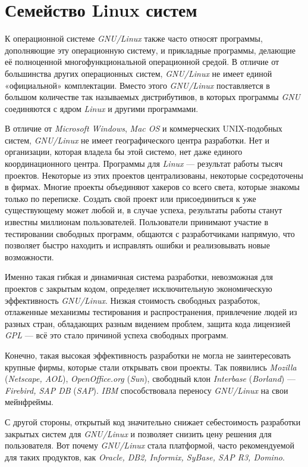 \section{Семейство Linux систем}

К операционной системе \textit{GNU/Linux} также часто относят программы, дополняющие эту операционную систему, и прикладные программы, делающие её полноценной многофункциональной операционной средой. В отличие от большинства других операционных систем, \textit{GNU/Linux} не имеет единой «официальной» комплектации. Вместо этого \textit{GNU/Linux} поставляется в большом количестве так называемых дистрибутивов, в которых программы \textit{GNU} соединяются с ядром \textit{Linux} и другими программами.

В отличие от \textit{Microsoft Windows}, \textit{Mac OS} и коммерческих UNIX-подобных систем, \textit{GNU/Linux} не имеет географического центра разработки. Нет и организации, которая владела бы этой системо, нет даже единого координационного центра. Программы для \textit{Linux} — результат работы тысяч проектов. Некоторые из этих проектов централизованы, некоторые сосредоточены в фирмах. Многие проекты объединяют хакеров со всего света, которые знакомы только по переписке. Создать свой проект или присоединиться к уже существующему может любой и, в случае успеха, результаты работы станут известны миллионам пользователей. Пользователи принимают участие в тестировании свободных программ, общаются с разработчиками напрямую, что позволяет быстро находить и исправлять ошибки и реализовывать новые возможности.

Именно такая гибкая и динамичная система разработки, невозможная для проектов с закрытым кодом, определяет исключительную экономическую эффективность \textit{GNU/Linux}. Низкая стоимость свободных разработок, отлаженные механизмы тестирования и распространения, привлечение людей из разных стран, обладающих разным видением проблем, защита кода лицензией \textit{GPL} — всё это стало причиной успеха свободных программ.

Конечно, такая высокая эффективность разработки не могла не заинтересовать крупные фирмы, которые стали открывать свои проекты. Так появились \textit{Mozilla} (\textit{Netscape, AOL}), \textit{OpenOffice.org} (\textit{Sun}), свободный клон \textit{Interbase} (\textit{Borland}) — \textit{Firebird, SAP DB} (\textit{SAP}). \textit{IBM} способствовала переносу \textit{GNU/Linux} на свои мейнфреймы.

С другой стороны, открытый код значительно снижает себестоимость разработки закрытых систем для \textit{GNU/Linux} и позволяет снизить цену решения для пользователя. Вот почему \textit{GNU/Linux} стала платформой, часто рекомендуемой для таких продуктов, как \textit{Oracle, DB2, Informix, SyBase, SAP R3, Domino}.

